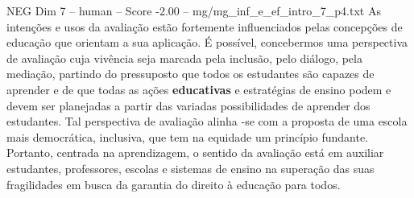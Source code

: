 \begin{textsample}{NEG Dim 7 – human – Score -2.00 – mg/mg\_inf\_e\_ef\_intro\_7\_p4.txt}  \label{ex:f7_neg_017}
As intenções e usos da avaliação estão fortemente influenciados pelas concepções de educação que orientam a sua aplicação. É possível, concebermos uma perspectiva de avaliação cuja vivência seja marcada pela inclusão, pelo diálogo, pela mediação, partindo do pressuposto que todos os estudantes são capazes de aprender e de que todas as ações \textbf{educativas} e estratégias de ensino podem e devem ser planejadas a partir das variadas possibilidades de aprender dos estudantes.
Tal perspectiva de avaliação alinha -se com a proposta de uma escola mais democrática, inclusiva, que tem na equidade um princípio fundante.
Portanto, centrada na aprendizagem, o sentido da avaliação está em auxiliar estudantes, professores, escolas e sistemas de ensino na superação das suas fragilidades em busca da garantia do direito à educação para todos.

\end{textsample}
